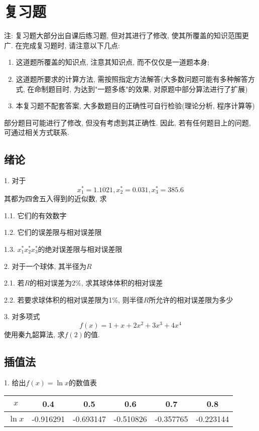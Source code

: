 \chapter{复习题}

注: 复习题大部分出自课后练习题, 但对其进行了修改, 使其所覆盖的知识范围更广. 在完成复习题时, 请注意以下几点:

\begin{enumerate}
    \item 这道题所覆盖的知识点, 注意其知识点, 而不仅仅是一道题本身;
    \item 这道题所要求的计算方法, 需按照指定方法解答(大多数问题可能有多种解答方式, 在命制题目时, 为达到"一题多练"的效果, 对原题中部分算法进行了扩展)
    \item 本复习题不配套答案, 大多数题目的正确性可自行检验(理论分析, 程序计算等)
\end{enumerate}

部分题目可能进行了修改, 但没有考虑到其正确性. 因此, 若有任何题目上的问题, 可通过相关方式联系.

\section*{绪论}

1. 对于
\begin{equation*}
    x_1^*=1.1021, x_2^*=0.031, x_3^*=385.6
\end{equation*}
其都为四舍五入得到的近似数, 求

1.1. 它们的有效数字

1.2. 它们的误差限与相对误差限

1.3. $x_1^*x_2^*x_3^*$的绝对误差限与相对误差限

2. 对于一个球体, 其半径为$R$

2.1. 若$R$的相对误差为2\%, 求其球体体积的相对误差

2.2. 若要求球体积的相对误差限为1\%, 则半径$R$所允许的相对误差限为多少

3. 对多项式
\begin{equation*}
    f(x)=1+x+2x^2+3x^3+4x^4
\end{equation*}
使用秦九韶算法, 求$f(2)$的值.

\section*{插值法}
1. 给出$f(x)=\ln x$的数值表

\begin{table}[h!]
    \begin{tabular}{c|ccccc}
        \hline
        $x$&0.4&0.5&0.6&0.7&0.8\\
        \hline
        $\ln x$&-0.916291&-0.693147&-0.510826&-0.357765&-0.223144\\
        \hline
    \end{tabular}
\end{table}

